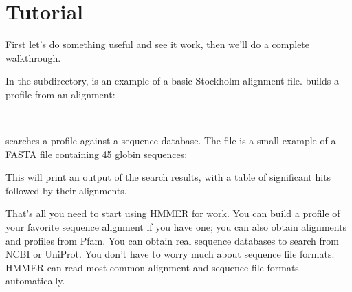 
\chapter{Tutorial}
\label{chapter:tutorial}
\setcounter{footnote}{0}



First let's do something useful and see it work, then we'll do a
complete walkthrough.

In the  subdirectory,  is an example
of a basic Stockholm alignment file.  builds a profile
from an alignment:

  \vspace{1ex}
   \\
  \vspace{1ex}

 searches a profile against a sequence database.  The
file  is a small example of a FASTA file
containing 45 globin sequences:

  \vspace{1ex}
  \vspace{1ex}
  
This will print an output of the search results, with a table of
significant hits followed by their alignments.

That's all you need to start using HMMER for work. You can build
a profile of your favorite sequence alignment if you have one; you can
also obtain alignments and profiles from
Pfam. You can
obtain real sequence databases to search from
NCBI
or
UniProt.
You don't have to worry much about sequence file formats. HMMER can
read most common alignment and sequence file formats
automatically. 
  
